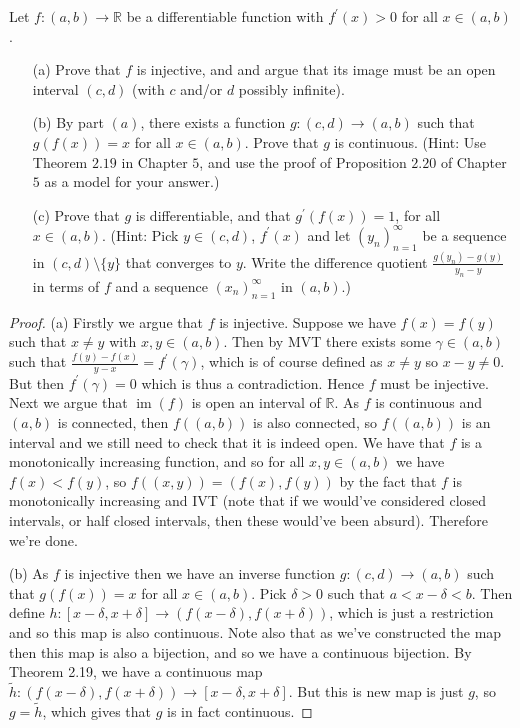 \documentclass[oneside]{amsart}
\theoremstyle{definition}
\DeclareMathOperator{\im}{im}
\newcommand{\rr}{\mathbb R}
\newcommand{\pp}{\prime}
\begin{document}
\begin{tcolorbox}[colback=black!5!white,colframe=black!75!black,title= Exercise $1.3.$]  Let $f \colon (a,b) \to \rr$ be a differentiable function with $f^\pp (x) >0$ for all $x \in (a,b)$.

\begin{itemize}
	\item [(a)] Prove that $f$ is injective, and and argue that its image must be an open interval $(c, d)$ (with $c$ and/or $d$ possibly infinite).
	\item [(b)] By part $(a)$, there exists a function $g \colon (c,d) \to (a,b)$ such that $g(f(x)) = x$ for all $x \in (a, b)$. Prove that $g$ is continuous. (Hint: Use Theorem $2.19$ in Chapter $5$, and use the proof of Proposition $2.20$ of Chapter $5$ as a model for your answer.)
	\item [(c)] Prove that $g$ is differentiable, and that $g^\pp(f(x))= 1$, for all $x \in (a,b)$. (Hint: Pick $y \in (c,d)$, $f^\pp(x)$ and let $(y_n)_{n=1}^\infty$ be a sequence in $(c, d) \setminus \{y\}$ that converges to $y$. Write the difference quotient $\frac{g(y_n)-g(y)}{y_n -y}$ in terms of $f$ and a sequence $(x_n)_{n=1}^\infty$ in $(a, b)$.)
\end{itemize}
\tcblower 
\begin{proof} (a) Firstly we argue that $f$ is injective. Suppose we have $f(x) = f(y)$ such that $x \neq y$ with $x, y \in (a,b)$. Then by MVT there exists some $\gamma \in (a,b)$ such that $\frac{f(y)-f(x)}{y-x} = f^\prime (\gamma)$, which is of course defined as $x \neq y$ so $x -y \neq 0$. But then $f^\pp (\gamma ) = 0$ which is thus a contradiction. Hence $f$ must be injective. Next we argue that $\im (f)$ is open an interval of $\rr$. As $f$ is continuous and $(a,b)$ is connected, then $f((a,b))$ is also connected, so $f((a,b))$ is an interval and we still need to check that it is indeed open. We have that $f$ is a monotonically increasing function, and so for all $x, y \in (a,b)$ we have $f(x) < f(y)$, so $f( (x,y)) = (f(x), f(y))$ by the fact that $f$ is monotonically increasing and IVT (note that if we would've considered closed intervals, or half closed intervals, then these would've been absurd). Therefore we're done.

(b) As $f$ is injective then we have an inverse function $g \colon (c,d) \to (a,b)$ such that $g(f(x)) = x$ for all $x \in (a,b)$. Pick $\delta > 0$ such that $a < x-\delta < b$. Then define $h\colon [x-\delta, x+\delta] \to (f(x-\delta), f(x+\delta))$, which is just a restriction and so this map is also continuous. Note also that as we've constructed the map then this map is also a bijection, and so we have a continuous bijection. By Theorem 2.19, we have a continuous map $\tilde{h} \colon (f(x-\delta), f(x+\delta)) \to [x-\delta, x+ \delta]$. But this is new map is just $g$, so $g = \tilde{h}$, which gives that $g$ is in fact continuous.


\end{proof}
\end{tcolorbox}
\end{document}
